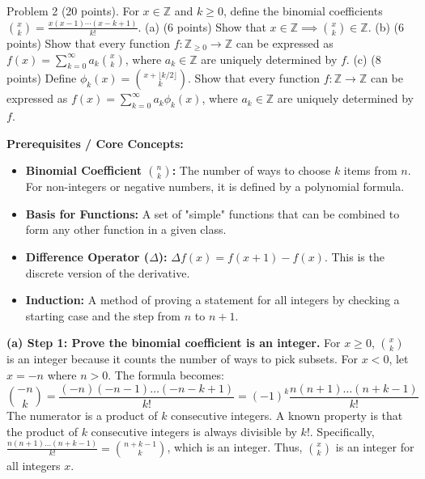 \begin{exercise}
\label{algebra:2016:7}
Problem 2 (20 points). For $x \in \mathbb{Z}$ and $k \geq 0$, define the binomial coefficients $\binom{x}{k} = \frac{x(x-1)\cdots(x-k+1)}{k!}$.
(a) (6 points) Show that $x \in \mathbb{Z} \implies \binom{x}{k} \in \mathbb{Z}$.
(b) (6 points) Show that every function $f : \mathbb{Z}_{\geq 0} \to \mathbb{Z}$ can be expressed as $f(x) = \sum_{k=0}^\infty a_k \binom{x}{k}$, where $a_k \in \mathbb{Z}$ are uniquely determined by $f$.
(c) (8 points) Define $\phi_k(x) = \binom{x + \lfloor k/2 \rfloor}{k}$. Show that every function $f : \mathbb{Z} \to \mathbb{Z}$ can be expressed as $f(x) = \sum_{k=0}^\infty a_k \phi_k(x)$, where $a_k \in \mathbb{Z}$ are uniquely determined by $f$.
\end{exercise}
\begin{solution}
\textbf{Prerequisites / Core Concepts:}
\begin{itemize}
    \item \textbf{Binomial Coefficient $\binom{n}{k}$:} The number of ways to choose $k$ items from $n$. For non-integers or negative numbers, it is defined by a polynomial formula.
    \item \textbf{Basis for Functions:} A set of "simple" functions that can be combined to form any other function in a given class.
    \item \textbf{Difference Operator ($\Delta$):} $\Delta f(x) = f(x+1) - f(x)$. This is the discrete version of the derivative.
    \item \textbf{Induction:} A method of proving a statement for all integers by checking a starting case and the step from $n$ to $n+1$.
\end{itemize}

\textbf{(a) Step 1: Prove the binomial coefficient is an integer.}
For $x \geq 0$, $\binom{x}{k}$ is an integer because it counts the number of ways to pick subsets.
For $x < 0$, let $x = -n$ where $n > 0$.
The formula becomes:
\[ \binom{-n}{k} = \frac{(-n)(-n-1)\dots(-n-k+1)}{k!} = (-1)^k \frac{n(n+1)\dots(n+k-1)}{k!} \]
The numerator is a product of $k$ consecutive integers. A known property is that the product of $k$ consecutive integers is always divisible by $k!$.
Specifically, $\frac{n(n+1)\dots(n+k-1)}{k!} = \binom{n+k-1}{k}$, which is an integer.
Thus, $\binom{x}{k}$ is an integer for all integers $x$.


\end{solution}

